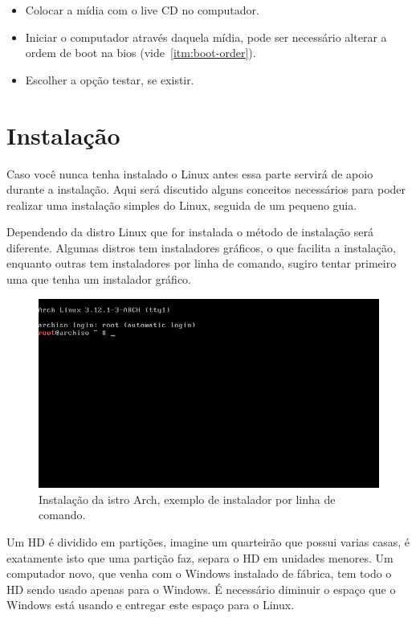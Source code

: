 \documentclass{handout_utfpr}
\begin{document}
\begin{itemize}
    \item Colocar a mídia com o live CD no computador.
    \item Iniciar o computador através daquela mídia, pode ser necessário alterar a ordem de boot na bios (vide~\ref{itm:boot-order}).
    \item Escolher a opção testar, se existir.
\end{itemize}

\section{Instalação}
Caso você nunca tenha instalado o Linux antes essa parte servirá de apoio durante a instalação. Aqui será discutido alguns conceitos necessários para poder realizar uma instalação simples do Linux, seguida de um pequeno guia.

Dependendo da distro Linux que for instalada o método de instalação será diferente. Algumas distros tem instaladores gráficos, o que facilita a instalação, enquanto outras tem instaladores por linha de comando, sugiro tentar primeiro uma que tenha um instalador gráfico.

\begin{figure}[H]
    \centering
    \includegraphics[scale=.5]{imagens/arch-install-01.png}
    \caption{Instalação da istro Arch, exemplo de instalador por linha de comando.}
    \label{fig:arch-installer}
\end{figure}

Um HD é dividido em partições, imagine um quarteirão que possui varias casas, é exatamente isto que uma partição faz, separa o HD em unidades menores. Um computador novo, que venha com o Windows instalado de fábrica, tem todo o HD sendo usado apenas para o Windows. É necessário diminuir o espaço que o Windows está usando e entregar este espaço para o Linux.
\end{document}
